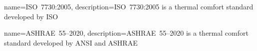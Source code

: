 \usepackage[nonumberlist,nogroupskip]{glossaries}

{
name={ISO~7730:2005},
description={ISO~7730:2005 is a thermal comfort standard developed by ISO}
}

{
name={ASHRAE~55--2020},
description={ASHRAE~55--2020 is a thermal comfort standard developed by ANSI and ASHRAE}
}

\makenoidxglossaries
